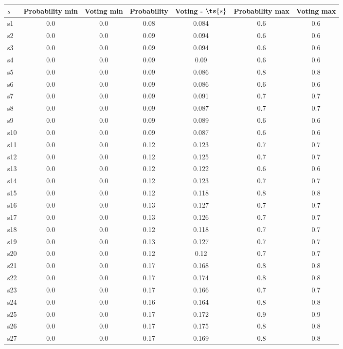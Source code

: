 \documentclass{article}
\begin{document}
\noindent\begin{tabular}{|l|c|c|c|c|c|c|}
\hline
$s$& Probability min & Voting min & Probability & Voting - $\ts{s}$ & Probability max & Voting max\\
\hline
s1 &0.0 & 0.0 & 0.08 & 0.084 & 0.6 & 0.6\\
\hline
s2 &0.0 & 0.0 & 0.09 & 0.094 & 0.6 & 0.6\\
\hline
s3 &0.0 & 0.0 & 0.09 & 0.094 & 0.6 & 0.6\\
\hline
s4 &0.0 & 0.0 & 0.09 & 0.09 & 0.6 & 0.6\\
\hline
s5 &0.0 & 0.0 & 0.09 & 0.086 & 0.8 & 0.8\\
\hline
s6 &0.0 & 0.0 & 0.09 & 0.086 & 0.6 & 0.6\\
\hline
s7 &0.0 & 0.0 & 0.09 & 0.091 & 0.7 & 0.7\\
\hline
s8 &0.0 & 0.0 & 0.09 & 0.087 & 0.7 & 0.7\\
\hline
s9 &0.0 & 0.0 & 0.09 & 0.089 & 0.6 & 0.6\\
\hline
s10 &0.0 & 0.0 & 0.09 & 0.087 & 0.6 & 0.6\\
\hline
s11 &0.0 & 0.0 & 0.12 & 0.123 & 0.7 & 0.7\\
\hline
s12 &0.0 & 0.0 & 0.12 & 0.125 & 0.7 & 0.7\\
\hline
s13 &0.0 & 0.0 & 0.12 & 0.122 & 0.6 & 0.6\\
\hline
s14 &0.0 & 0.0 & 0.12 & 0.123 & 0.7 & 0.7\\
\hline
s15 &0.0 & 0.0 & 0.12 & 0.118 & 0.8 & 0.8\\
\hline
s16 &0.0 & 0.0 & 0.13 & 0.127 & 0.7 & 0.7\\
\hline
s17 &0.0 & 0.0 & 0.13 & 0.126 & 0.7 & 0.7\\
\hline
s18 &0.0 & 0.0 & 0.12 & 0.118 & 0.7 & 0.7\\
\hline
s19 &0.0 & 0.0 & 0.13 & 0.127 & 0.7 & 0.7\\
\hline
s20 &0.0 & 0.0 & 0.12 & 0.12 & 0.7 & 0.7\\
\hline
s21 &0.0 & 0.0 & 0.17 & 0.168 & 0.8 & 0.8\\
\hline
s22 &0.0 & 0.0 & 0.17 & 0.174 & 0.8 & 0.8\\
\hline
s23 &0.0 & 0.0 & 0.17 & 0.166 & 0.7 & 0.7\\
\hline
s24 &0.0 & 0.0 & 0.16 & 0.164 & 0.8 & 0.8\\
\hline
s25 &0.0 & 0.0 & 0.17 & 0.172 & 0.9 & 0.9\\
\hline
s26 &0.0 & 0.0 & 0.17 & 0.175 & 0.8 & 0.8\\
\hline
s27 &0.0 & 0.0 & 0.17 & 0.169 & 0.8 & 0.8\\

\end{tabular}
\end{document}
